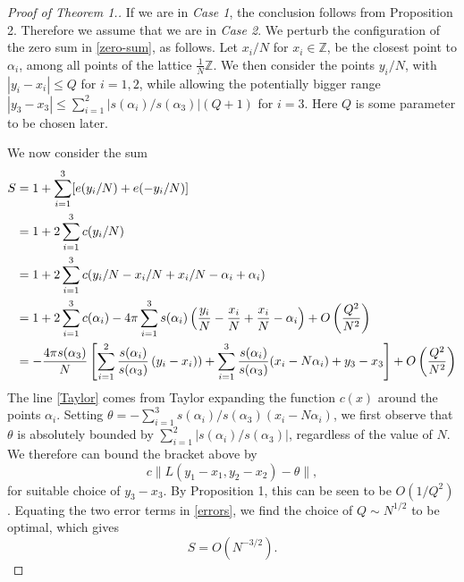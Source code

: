 \documentclass[10pt,a4paper]{amsart}
\newcommand{\Z}{\mathbb{Z}}
\begin{document}
\begin{proof}[\textit{Proof of Theorem 1.}]
    If we are in \textit{Case 1}, the conclusion follows from Proposition 2. Therefore we assume that we are in \textit{Case 2}. We perturb the configuration of the zero sum in \eqref{zero-sum}, as follows. Let $x_i/N$ for $x_i\in \Z$, be the closest point to $\alpha_i$, among all points of the lattice $\frac{1}{N}\Z$. We then consider the points $y_i/N$, with $|y_i-x_i|\leq Q$ for $i=1,2$, while allowing the potentially bigger range $|y_3-x_3|\leq \sum_{i=1}^2 |s(\alpha_i)/s(\alpha_3)|(Q+1) $ for $i=3$. Here $Q$ is some parameter to be chosen later.

    We now consider the sum
    \begin{align}
        S&=1+\sum_{i=1}^3[e(y_i/N)+e(-y_i/N)]\\
        &=1+2\sum_{i=1}^3 c(y_i/N) \notag \\
        &=1+2\sum_{i=1}^3 c(y_i/N-x_i/N+x_i/N-\alpha_i+\alpha_i)\notag\\
        &=1+2\sum_{i=1}^3 c(\alpha_i)-4\pi\sum_{i=1}^3s(\alpha_i)\left( \frac{y_i}{N}-\frac{x_i}{N}+\frac{x_i}{N}-\alpha_i \right)+O\left(\frac{Q^2}{N^2}\right) \label{Taylor} \\
        &=-\frac{4\pi s(\alpha_3)}{N}\left[\sum_{i=1}^2\frac{s(\alpha_i)}{s(\alpha_3)}\left( y_i-x_i)  \right)+\sum_{i=1}^3\frac{s(\alpha_i)}{s(\alpha_3)}(x_i-N\alpha_i)+y_3-x_3  \right]+O\left(\frac{Q^2}{N^2}  \right)\label{errors}
    \end{align}
    The line \eqref{Taylor} comes from Taylor expanding the function $c(x)$ around the points $\alpha_i$. Setting $\theta=-\sum_{i=1}^3s(\alpha_i)/s(\alpha_3)(x_i-N\alpha_i)$, we first observe that $\theta$ is absolutely bounded by $\sum_{i=1}^2|s(\alpha_i)/s(\alpha_3)|$, regardless of the value of $N$. We therefore can bound the bracket above by
    \begin{equation}
        c\| L(y_1-x_1,y_2-x_2) -\theta \|,
    \end{equation}
    for suitable choice of $y_3-x_3$. By Proposition 1, this can be seen to be $O(1/Q^2)$. Equating the two error terms in \eqref{errors}, we find the choice of $Q\sim N^{1/2}$ to be optimal, which gives
    $$  S=O(N^{-3/2}). $$
\end{proof}
\end{document}
